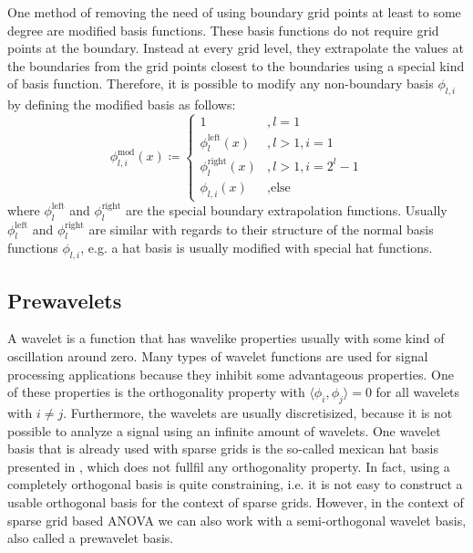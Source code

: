 \documentclass[
  a4paper,  %
  twoside,  %
  bibliography=totoc,
  headsepline,
  cleardoublepage=empty,
  parskip=half,
  draft=false
]{scrbook}
\begin{document}
One method of removing the need of using boundary grid points at least to some degree are modified basis functions.
These basis functions do not require grid points at the boundary.
Instead at every grid level, they extrapolate the values at the boundaries from the grid points closest to the boundaries using a special kind of basis function.
Therefore, it is possible to modify any non-boundary basis $\phi_{l,i}$ by defining the modified basis as follows:
\begin{equation}
\phi^{\text{mod}}_{l,i}(x) \coloneqq
\begin{cases}
1 &, l=1\\
\phi^{\text{left}}_{l}(x)&, l>1, i=1\\
\phi^{\text{right}}_{l}(x)&, l>1, i=2^l - 1\\
\phi_{l,i}(x)&, \text{else}
\end{cases}
\nonumber
\end{equation}
where $\phi^{\text{left}}_{l}$ and $\phi^{\text{right}}_{l}$ are the special boundary extrapolation functions.
Usually $\phi^{\text{left}}_{l}$ and $\phi^{\text{right}}_{l}$ are similar with regards to their structure of the normal basis functions $\phi_{l,i}$, e.g. a hat basis is usually modified with special hat functions.






\subsection{Prewavelets}

A wavelet is a function that has wavelike properties usually with some kind of oscillation around zero.
Many types of wavelet functions are used for signal processing applications because they inhibit some advantageous properties.
One of these properties is the orthogonality property with $\langle \phi_{i},\phi_{j} \rangle = 0$ for all wavelets with $i \neq j$.
Furthermore,  the wavelets are usually discretisized, because it is not possible to analyze a signal using an infinite amount of wavelets.
One wavelet basis that is already used with sparse grids is the so-called mexican hat basis presented in \cite{}, which does not fullfil any orthogonality property.
In fact, using a completely orthogonal basis is quite constraining, i.e. it is not easy to construct a usable orthogonal basis for the context of sparse grids.
However, in the context of sparse grid based ANOVA we can also work with a semi-orthogonal wavelet basis, also called a prewavelet basis.
\end{document}
